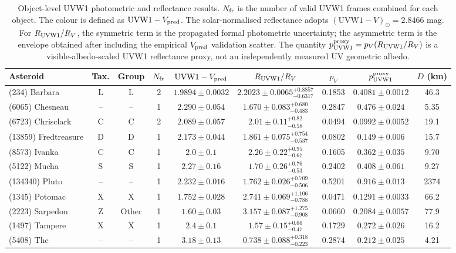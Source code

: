 \begin{table}[t]
\centering
\small
\setlength{\tabcolsep}{2.2pt}
\renewcommand{\arraystretch}{1.05}
\begin{tabular}{lcccccccc}
\toprule
Asteroid & Tax. & Group & $N_{\rm fr}$ & $\mathrm{UVW1}-V_{\rm pred}$ & $R_{\rm UVW1}/R_V$ & $p_V$ & $p_{\rm UVW1}^{\rm proxy}$ & $D$ (km) \\
\midrule
(234) Barbara & L & L & 2 & $1.9894 \pm 0.0032$ & $2.2023 \pm 0.0065{}_{-0.6317}^{+0.8857}$ & 0.1853 & $0.4081 \pm 0.0012$ & 46.3 \\
(6065) Chesneau & -- & -- & 1 & $2.290 \pm 0.054$ & $1.670 \pm 0.083{}_{-0.483}^{+0.680}$ & 0.2847 & $0.476 \pm 0.024$ & 5.35 \\
(6723) Chrisclark & C & C & 2 & $2.089 \pm 0.057$ & $2.01 \pm 0.11{}_{-0.58}^{+0.82}$ & 0.0494 & $0.0992 \pm 0.0052$ & 19.1 \\
(13859) Fredtreasure & D & D & 1 & $2.173 \pm 0.044$ & $1.861 \pm 0.075{}_{-0.537}^{+0.754}$ & 0.0802 & $0.149 \pm 0.006$ & 15.7 \\
(8573) Ivanka & C & C & 1 & $2.0 \pm 0.1$ & $2.26 \pm 0.22{}_{-0.67}^{+0.95}$ & 0.1605 & $0.362 \pm 0.035$ & 9.70 \\
(5122) Mucha & S & S & 1 & $2.27 \pm 0.16$ & $1.70 \pm 0.26{}_{-0.53}^{+0.76}$ & 0.2402 & $0.408 \pm 0.061$ & 9.27 \\
(134340) Pluto & -- & -- & 1 & $2.232 \pm 0.016$ & $1.762 \pm 0.026{}_{-0.506}^{+0.709}$ & 0.5201 & $0.916 \pm 0.013$ & 2374 \\
(1345) Potomac & X & X & 1 & $1.752 \pm 0.028$ & $2.741 \pm 0.069{}_{-0.788}^{+1.106}$ & 0.0471 & $0.1291 \pm 0.0033$ & 66.2 \\
(2223) Sarpedon & Z & Other & 1 & $1.60 \pm 0.03$ & $3.157 \pm 0.087{}_{-0.908}^{+1.275}$ & 0.0660 & $0.2084 \pm 0.0057$ & 77.9 \\
(1497) Tampere & X & X & 1 & $2.4 \pm 0.1$ & $1.57 \pm 0.15{}_{-0.47}^{+0.66}$ & 0.1729 & $0.272 \pm 0.026$ & 16.2 \\
(5408) The & -- & -- & 1 & $3.18 \pm 0.13$ & $0.738 \pm 0.088{}_{-0.223}^{+0.318}$ & 0.2874 & $0.212 \pm 0.025$ & 4.21 \\
\bottomrule
\end{tabular}
\caption{Object-level UVW1 photometric and reflectance results. $N_{\rm fr}$ is the number of valid UVW1 frames combined for each object. The colour is defined as $\mathrm{UVW1}-V_{\rm pred}$. The solar-normalised reflectance adopts $(\mathrm{UVW1}-V)_\odot=2.8466$ mag. For $R_{\rm UVW1}/R_V$, the symmetric term is the propagated formal photometric uncertainty; the asymmetric term is the envelope obtained after including the empirical $V_{\rm pred}$ validation scatter. The quantity $p_{\rm UVW1}^{\rm proxy}=p_V(R_{\rm UVW1}/R_V)$ is a visible-albedo-scaled UVW1 reflectance proxy, not an independently measured UV geometric albedo.}
\label{tab:uvw1_reflectance_results}
\end{table}
